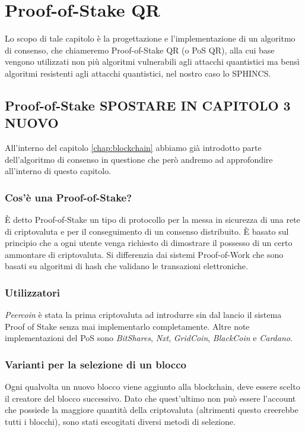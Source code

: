\chapter{Proof-of-Stake QR}
Lo scopo di tale capitolo è la progettazione e l'implementazione di un algoritmo di consenso, che chiameremo Proof-of-Stake QR (o PoS QR), alla cui base vengono utilizzati non più algoritmi vulnerabili agli attacchi quantistici ma bensì algoritmi resistenti agli attacchi quantistici, nel nostro caso lo SPHINCS.

\section{Proof-of-Stake SPOSTARE IN CAPITOLO 3 NUOVO}
All'interno del capitolo \ref{chap:blockchain} abbiamo già introdotto parte dell'algoritmo di consenso in questione che però andremo ad approfondire all'interno di questo capitolo.

\subsection{Cos'è una Proof-of-Stake?}
È detto Proof-of-Stake un tipo di protocollo per la messa in sicurezza di una rete di criptovaluta e per il conseguimento di un consenso distribuito. È basato sul principio che a ogni utente venga richiesto di dimostrare il possesso di un certo ammontare di criptovaluta. Si differenzia dai sistemi Proof-of-Work che sono basati su algoritmi di hash che validano le transazioni elettroniche.

\subsection{Utilizzatori}
\textit{Peercoin} è stata la prima criptovaluta ad introdurre sin dal lancio il sistema Proof of Stake senza mai implementarlo completamente. Altre note implementazioni del PoS sono \textit{BitShares}, \textit{Nxt}, \textit{GridCoin}, \textit{BlackCoin} e \textit{Cardano}.

\subsection{Varianti per la selezione di un blocco}
Ogni qualvolta un nuovo blocco viene aggiunto alla blockchain, deve essere scelto il creatore del blocco successivo. Dato che quest'ultimo non può essere l'account che possiede la maggiore quantità della criptovaluta (altrimenti questo creerebbe tutti i blocchi), sono stati escogitati diversi metodi di selezione.

